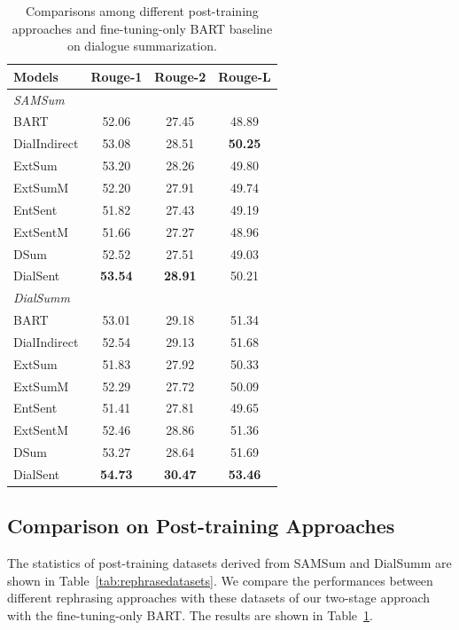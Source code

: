 \begin{table}
	\small
	\centering
	\begin{tabular}{lccc}
		\toprule[1pt]
		\textbf{Models} & \textbf{Rouge-1} & \textbf{Rouge-2} & \textbf{Rouge-L} \\
		\midrule[1pt]
		\multicolumn{4}{l}{\textit{SAMSum}} \\
		{BART} &52.06 &27.45 &48.89 \\
		{DialIndirect} &  53.08&28.51  & \textbf{50.25} \\
		{ExtSum} &  53.20& 28.26 & 49.80 \\
		{ExtSumM} & 52.20 & 27.91 & 49.74   \\
		{EntSent} & 51.82 & 27.43 & 49.19   \\
		{ExtSentM} & 51.66 & 27.27 &  48.96  \\
		{DSum} & 52.52&27.51 &49.03 \\
		{DialSent} & \textbf{53.54} & \textbf{28.91} &  50.21 \\
		
		\midrule[1pt]
		
		\multicolumn{4}{l}{\textit{DialSumm}} \\
		{BART} & 53.01&29.18 &51.34 \\
		{DialIndirect} &  52.54&29.13  &51.68 \\
		{ExtSum} & 51.83 & 27.92 &50.33  \\
		{ExtSumM} & 52.29 & 27.72 & 50.09   \\
		{EntSent} & 51.41 & 27.81 & 49.65   \\
		{ExtSentM} & 52.46 & 28.86 & 51.36 \\
		{DSum} & 53.27 & 28.64 & 51.69 \\
		{DialSent} &\textbf{54.73} & \textbf{30.47}&  \textbf{53.46}  \\
		\bottomrule[1pt]
	\end{tabular}
	\caption{Comparisons among different post-training approaches and fine-tuning-only BART baseline on dialogue summarization.}
	\label{tab:rephrasing}
\end{table}

\subsection{Comparison on Post-training Approaches}\label{sec:posresult}

The statistics of post-training datasets derived from SAMSum and DialSumm are shown in Table~\ref{tab:rephrasedatasets}. We compare the performances between different rephrasing approaches with these datasets of our two-stage approach with the fine-tuning-only BART. The results are shown in Table~\ref{tab:rephrasing}. 


